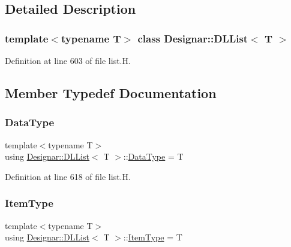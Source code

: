 \subsection{Detailed Description}
\subsubsection*{template$<$typename T$>$\newline
class Designar\+::\+D\+L\+List$<$ T $>$}



Definition at line 603 of file list.\+H.



\subsection{Member Typedef Documentation}
\mbox{\label{class_designar_1_1_d_l_list_ac2f57201101389ca63aec1c2fba61038}} 
\subsubsection{\texorpdfstring{Data\+Type}{DataType}}
{\footnotesize\ttfamily template$<$typename T$>$ \\
using \hyperlink{class_designar_1_1_d_l_list}{Designar\+::\+D\+L\+List}$<$ T $>$\+::\hyperlink{class_designar_1_1_d_l_list_ac2f57201101389ca63aec1c2fba61038}{Data\+Type} =  T}



Definition at line 618 of file list.\+H.

\mbox{\label{class_designar_1_1_d_l_list_a622fc13673b169c75309314ae2ebc005}} 
\subsubsection{\texorpdfstring{Item\+Type}{ItemType}}
{\footnotesize\ttfamily template$<$typename T$>$ \\
using \hyperlink{class_designar_1_1_d_l_list}{Designar\+::\+D\+L\+List}$<$ T $>$\+::\hyperlink{class_designar_1_1_d_l_list_a622fc13673b169c75309314ae2ebc005}{Item\+Type} =  T}



